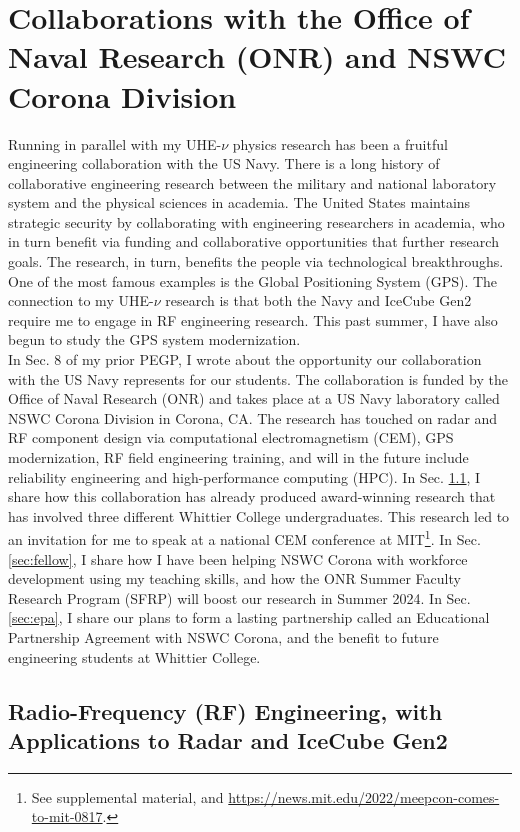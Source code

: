 \documentclass[../../../main.tex]{subfiles}
\begin{document}
\section{Collaborations with the Office of Naval Research (ONR) and NSWC Corona Division}
\label{sec:naval_research}

Running in parallel with my UHE-$\nu$ physics research has been a fruitful engineering collaboration with the US Navy.  There is a long history of collaborative engineering research between the military and national laboratory system and the physical sciences in academia.  The United States maintains strategic security by collaborating with engineering researchers in academia, who in turn benefit via funding and collaborative opportunities that further research goals.  The research, in turn, benefits the people via technological breakthroughs.  One of the most famous examples is the Global Positioning System (GPS).  The connection to my UHE-$\nu$ research is that both the Navy and IceCube Gen2 require me to engage in RF engineering research.  This past summer, I have also begun to study the GPS system modernization.
\\
\vspace{0.25cm}
In Sec. 8 of my prior PEGP, I wrote about the opportunity our collaboration with the US Navy represents for our students.  The collaboration is funded by the Office of Naval Research (ONR) and takes place at a US Navy laboratory called NSWC Corona Division in Corona, CA.  The research has touched on radar and RF component design via computational electromagnetism (CEM), GPS modernization, RF field engineering training, and will in the future include reliability engineering and high-performance computing (HPC).  In Sec. \ref{sec:cem_paper}, I share how this collaboration has already produced award-winning research that has involved three different Whittier College undergraduates.  This research led to an invitation for me to speak at a national CEM conference at MIT\footnote{See supplemental material, and \url{https://news.mit.edu/2022/meepcon-comes-to-mit-0817}.}.  In Sec. \ref{sec:fellow}, I share how I have been helping NSWC Corona with workforce development using my teaching skills, and how the ONR Summer Faculty Research Program (SFRP) will boost our research in Summer 2024.  In Sec. \ref{sec:epa}, I share our plans to form a lasting partnership called an Educational Partnership Agreement with NSWC Corona, and the benefit to future engineering students at Whittier College.

\subsection{Radio-Frequency (RF) Engineering, with Applications to Radar and IceCube Gen2}
\label{sec:cem_paper}
\end{document}
